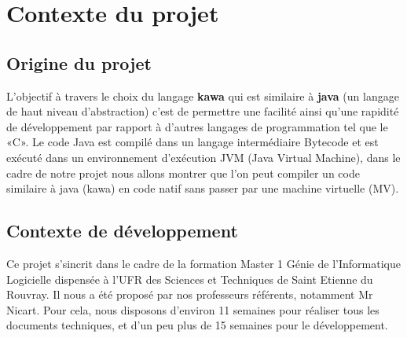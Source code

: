 \documentclass{../res/univ-projet}
\begin{document}
\maketitle
\newpage
\tableofcontents
\newpage

\section{Contexte du projet}
  \subsection{Origine du projet}
    L'objectif à travers le choix du langage \textbf {kawa} qui est similaire à
    \textbf {java} (un langage de haut niveau d'abstraction) c'est de permettre
    une facilité ainsi qu'une rapidité de développement par rapport à d'autres 
    langages de programmation tel que le «C». Le code Java  est compilé dans un langage intermédiaire  Bytecode et est exécuté dans un environnement 
    d'exécution JVM (Java Virtual Machine), dans le cadre de notre projet nous 
    allons montrer que l'on peut compiler un code similaire à java (kawa) en 
    code natif sans passer par une machine virtuelle (MV).

  \subsection{Contexte de développement}
    Ce projet s'sincrit dans le cadre de la formation Master 1 Génie de l'Informatique Logicielle dispensée à l'UFR des Sciences et Techniques de Saint Etienne du Rouvray. Il nous a été proposé par nos professeurs référents, notamment Mr Nicart. Pour cela, nous disposons d'environ 11 semaines pour réaliser tous les documents techniques, et d'un peu plus de 15 semaines pour le développement.\\
\end{document}
